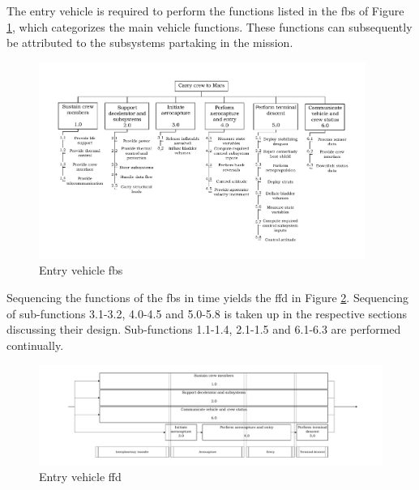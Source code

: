 The entry vehicle is required to perform the functions listed in the \acrfull{fbs} of Figure \ref{fig:fbs}, which categorizes the main vehicle functions. These functions can subsequently be attributed to the subsystems partaking in the mission.
\begin{figure}[ht]
	\includegraphics[width=0.95\textwidth]{./Figure/subsystem_breakdown/FBS.pdf}
	\caption{Entry vehicle \acrfull{fbs}}
	\label{fig:fbs}
\end{figure}
Sequencing the functions of the \gls{fbs} in time yields the \acrfull{ffd} in Figure \ref{fig:ffd}. Sequencing of sub-functions 3.1-3.2, 4.0-4.5 and 5.0-5.8 is taken up in the respective sections discussing their design. Sub-functions 1.1-1.4, 2.1-1.5 and 6.1-6.3 are performed continually.
\begin{figure}[h]
	\includegraphics[width=1.00\textwidth]{./Figure/subsystem_breakdown/FFD.pdf}
	\caption{Entry vehicle \acrfull{ffd}}
	\label{fig:ffd}
\end{figure}



